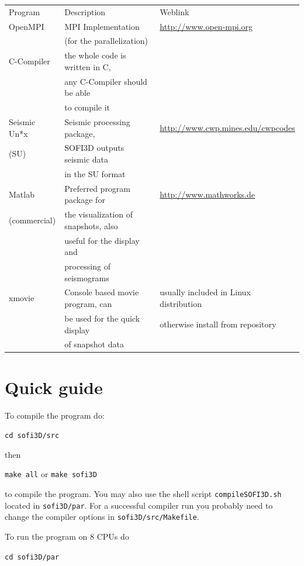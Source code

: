 \documentclass[11pt,onecolumn,oneside]{article}
\begin{document}
\begin{center}
\begin{small}
\begin{tabular}{lll}
Program & Description & Weblink \\ 
OpenMPI & MPI Implementation & \url{http://www.open-mpi.org} \\
 & (for the parallelization) & \\
C-Compiler & the whole code is written in C,& \\
& any C-Compiler should be able & \\
& to compile it & \\
Seismic Un*x & Seismic processing package, & \url{http://www.cwp.mines.edu/cwpcodes} \\
(SU)  & SOFI3D outputs seismic data & \\
& in the SU format & \\
Matlab & Preferred program package for & \url{http://www.mathworks.de} \\
(commercial)& the visualization of snapshots, also  & \\
& useful for the display and & \\
& processing of seismograms & \\
xmovie & Console based movie program, can & usually included in Linux distribution\\
& be used for the quick display & otherwise install from repository\\
& of snapshot data  &
\end{tabular}
\end{small}
\end{center}

\newpage 
\section{Quick guide}\label{qguide}
To compile the program do: 

 \lstinline{cd sofi3D/src}

then

 \lstinline{make all} or \lstinline{make sofi3D}

to compile the program. You may also use the shell script  \lstinline{compileSOFI3D.sh} located in  \lstinline{sofi3D/par}. For a successful compiler run you probably need to change the compiler options in  \lstinline{sofi3D/src/Makefile}. 

To run the program on 8 CPUs do

 \lstinline{cd sofi3D/par}
\end{document}
